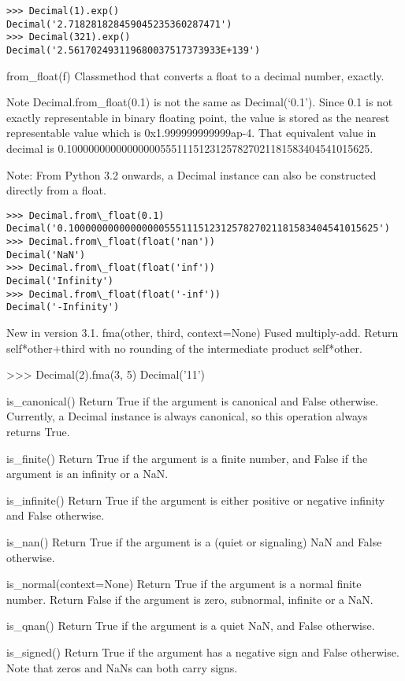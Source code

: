 \begin{lstlisting}
>>> Decimal(1).exp()
Decimal('2.718281828459045235360287471')
>>> Decimal(321).exp()
Decimal('2.561702493119680037517373933E+139')
\end{lstlisting}

from\_float(f)
Classmethod that converts a float to a decimal number, exactly.

Note Decimal.from\_float(0.1) is not the same as Decimal(‘0.1’). Since 0.1 is not exactly representable in binary floating point, the value is stored as the nearest representable value which is 0x1.999999999999ap-4. That equivalent value in decimal is 0.1000000000000000055511151231257827021181583404541015625.

Note:
From Python 3.2 onwards, a Decimal instance can also be constructed directly from a float.


\begin{lstlisting}
>>> Decimal.from\_float(0.1)
Decimal('0.1000000000000000055511151231257827021181583404541015625')
>>> Decimal.from\_float(float('nan'))
Decimal('NaN')
>>> Decimal.from\_float(float('inf'))
Decimal('Infinity')
>>> Decimal.from\_float(float('-inf'))
Decimal('-Infinity')
\end{lstlisting}


New in version 3.1.
fma(other, third, context=None)
Fused multiply-add. Return self*other+third with no rounding of the intermediate product self*other.


>>> Decimal(2).fma(3, 5)
Decimal('11')

is\_canonical()
Return True if the argument is canonical and False otherwise. Currently, a Decimal instance is always canonical, so this operation always returns True.

is\_finite()
Return True if the argument is a finite number, and False if the argument is an infinity or a NaN.

is\_infinite()
Return True if the argument is either positive or negative infinity and False otherwise.

is\_nan()
Return True if the argument is a (quiet or signaling) NaN and False otherwise.

is\_normal(context=None)
Return True if the argument is a normal finite number. Return False if the argument is zero, subnormal, infinite or a NaN.

is\_qnan()
Return True if the argument is a quiet NaN, and False otherwise.

is\_signed()
Return True if the argument has a negative sign and False otherwise. Note that zeros and NaNs can both carry signs.

